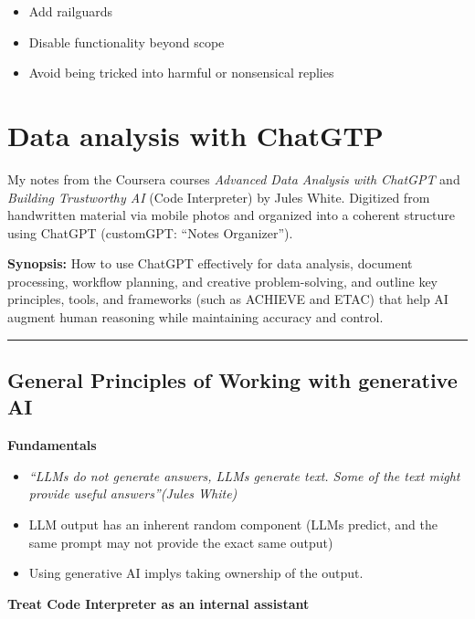 \documentclass[
  letterpaper,
  DIV=11,
  numbers=noendperiod]{scrreprt}
\providecommand{\tightlist}{%
  \setlength{\itemsep}{0pt}\setlength{\parskip}{0pt}}
\begin{document}
\begin{itemize}
\tightlist
\item
  Add railguards
\item
  Disable functionality beyond scope
\item
  Avoid being tricked into harmful or nonsensical replies
\end{itemize}


\chapter{Data analysis with ChatGTP}\label{data-analysis-with-chatgtp}

My notes from the Coursera courses \emph{Advanced Data Analysis with
ChatGPT} and \emph{Building Trustworthy AI} (Code Interpreter) by Jules
White. Digitized from handwritten material via mobile photos and
organized into a coherent structure using ChatGPT (customGPT: ``Notes
Organizer'').

\textbf{Synopsis:} How to use ChatGPT effectively for data analysis,
document processing, workflow planning, and creative problem-solving,
and outline key principles, tools, and frameworks (such as ACHIEVE and
ETAC) that help AI augment human reasoning while maintaining accuracy
and control.

\begin{center}\rule{0.5\linewidth}{0.5pt}\end{center}

\section{General Principles of Working with generative
AI}\label{general-principles-of-working-with-generative-ai}

\textbf{Fundamentals}

\begin{itemize}
\tightlist
\item
  \emph{``LLMs do not generate answers, LLMs generate text. Some of the
  text might provide useful answers''(Jules White)}
\item
  LLM output has an inherent random component (LLMs predict, and the
  same prompt may not provide the exact same output)
\item
  Using generative AI implys taking ownership of the output.
\end{itemize}

\textbf{Treat Code Interpreter as an internal assistant}
\end{document}
